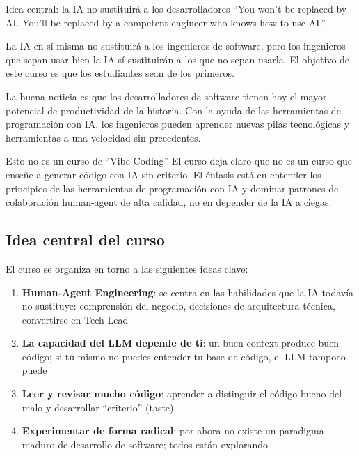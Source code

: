\documentclass[a4paper]{article}
\begin{document}
\begin{importantbox}{Idea central: la IA no sustituirá a los desarrolladores}
``You won't be replaced by AI. You'll be replaced by a competent engineer who knows how to use AI.''

La IA en sí misma no sustituirá a los ingenieros de software, pero los ingenieros que sepan usar bien la IA sí sustituirán a los que no sepan usarla. El objetivo de este curso es que los estudiantes sean de los primeros.
\end{importantbox}

La buena noticia es que los desarrolladores de software tienen hoy el mayor potencial de productividad de la historia. Con la ayuda de las herramientas de programación con IA, los ingenieros pueden aprender nuevas pilas tecnológicas y herramientas a una velocidad sin precedentes.

\begin{warningbox}{Esto no es un curso de ``Vibe Coding''}
El curso deja claro que no es un curso que enseñe a generar código con IA sin criterio. El énfasis está en entender los principios de las herramientas de programación con IA y dominar patrones de colaboración human-agent de alta calidad, no en depender de la IA a ciegas.
\end{warningbox}

\subsection{Idea central del curso}

El curso se organiza en torno a las siguientes ideas clave:

\begin{enumerate}
    \item \textbf{Human-Agent Engineering}: se centra en las habilidades que la IA todavía no sustituye: comprensión del negocio, decisiones de arquitectura técnica, convertirse en Tech Lead
    \item \textbf{La capacidad del LLM depende de ti}: un buen context produce buen código; si tú mismo no puedes entender tu base de código, el LLM tampoco puede
    \item \textbf{Leer y revisar mucho código}: aprender a distinguir el código bueno del malo y desarrollar ``criterio'' (taste)
    \item \textbf{Experimentar de forma radical}: por ahora no existe un paradigma maduro de desarrollo de software; todos están explorando
\end{enumerate}
\end{document}
